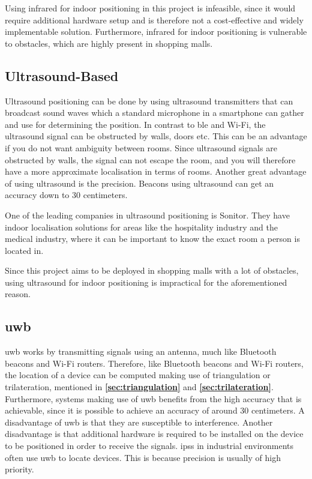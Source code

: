 Using infrared for indoor positioning in this project is infeasible, since it would require additional hardware setup and is therefore not a cost-effective and widely implementable solution. Furthermore, infrared for indoor positioning is vulnerable to obstacles, which are highly present in shopping malls.

\subsection{Ultrasound-Based}
Ultrasound positioning can be done by using ultrasound transmitters that can broadcast sound waves which a standard microphone in a smartphone can gather and use for determining the position\cite{IPSMapsPeople}. In contrast to \gls{ble} and Wi-Fi, the ultrasound signal can be obstructed by walls, doors etc. This can be an advantage if you do not want ambiguity between rooms. Since ultrasound signals are obstructed by walls, the signal can not escape the room, and you will therefore have a more approximate localisation in terms of rooms.\cite{leverage-ultrasound} Another great advantage of using ultrasound is the precision. Beacons using ultrasound can get an accuracy down to 30 centimeters.\cite{mapspeopleultrasound}

One of the leading companies in ultrasound positioning is Sonitor. They have indoor localisation solutions for areas like the hospitality industry and the medical industry, where it can be important to know the exact room a person is located in.\cite{sonitor}

Since this project aims to be deployed in shopping malls with a lot of obstacles, using ultrasound for indoor positioning is impractical for the aforementioned reason.

\subsection{\acrlong{uwb}}
\gls{uwb} works by transmitting signals using an antenna, much like Bluetooth beacons and Wi-Fi routers. Therefore, like Bluetooth beacons and Wi-Fi routers, the location of a device can be computed making use of triangulation or trilateration, mentioned in \textbf{\autoref{sec:triangulation}} and \textbf{\autoref{sec:trilateration}}. Furthermore, systems making use of \gls{uwb} benefits from the high accuracy that is achievable, since it is possible to achieve an accuracy of around 30 centimeters. A disadvantage of \gls{uwb} is that they are susceptible to interference.\cite{oriient} Another disadvantage is that additional hardware is required to be installed on the device to be positioned in order to receive the signals\cite{LundIMU}.
\gls{ips}s in industrial environments often use \gls{uwb} to locate devices. This is because precision is usually of high priority.\cite{Infsoft}

